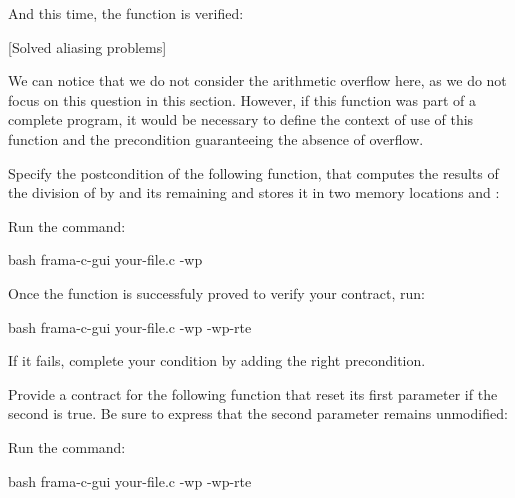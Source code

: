 


And this time, the function is verified:



[Solved aliasing problems]


We can notice that we do not consider the arithmetic overflow here, as
we do not focus on this question in this section. However, if this
function was part of a complete program, it would be necessary to define
the context of use of this function and the precondition guaranteeing
the absence of overflow.








Specify the postcondition of the following function, that computes the
results of the division of  by  and its
remaining and stores it in two memory locations  and
:



Run the command:

\begin{CodeBlock}{bash}
frama-c-gui your-file.c -wp 
\end{CodeBlock}


Once the function is successfuly proved to verify your contract, run:


\begin{CodeBlock}{bash}
frama-c-gui your-file.c -wp -wp-rte
\end{CodeBlock}


If it fails, complete your condition by adding the right precondition.






Provide a contract for the following function that reset its first parameter
if the second is true. Be sure to express that the second parameter remains
unmodified:




Run the command:


\begin{CodeBlock}{bash}
frama-c-gui your-file.c -wp -wp-rte
\end{CodeBlock}



